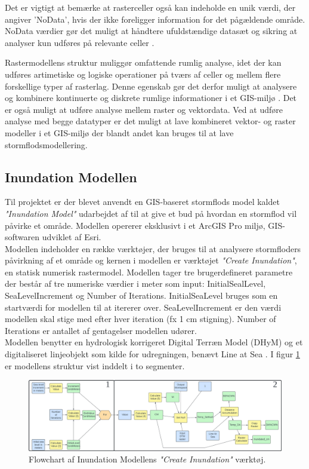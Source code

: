 Det er vigtigt at bemærke at rasterceller også kan indeholde en unik værdi, der angiver 'NoData', hvis der ikke foreligger information for det pågældende område. NoData værdier gør det muligt at håndtere ufuldstændige datasæt og sikring at analyser kun udføres på relevante celler \citep{bolstad_gis_2022, longley_geographical_2008}.

Rastermodellens struktur muliggør omfattende rumlig analyse, idet der kan udføres artimetiske og logiske operationer på tværs af celler og mellem flere forskellige typer af rasterlag. Denne egenskab gør det derfor muligt at analysere og kombinere kontinuerte og diskrete rumlige informationer i et GIS-miljø  \citep{bolstad_gis_2022, longley_geographical_2008}. Det er også muligt at udføre analyse mellem raster og vektordata. Ved at udføre analyse med begge datatyper er det muligt at lave kombineret vektor- og raster modeller i et GIS-miljø der blandt andet kan bruges til at lave stormflodsmodellering.

\subsection{Inundation Modellen} \label{Afsnit: Inundation Model}

Til projektet er der blevet anvendt en GIS-baseret stormflods model kaldet \textit{"Inundation Model"} udarbejdet af \cite{balstrom_kirby_inundation} til at give et bud på hvordan en stormflod vil påvirke et område. Modellen opererer eksklusivt i et ArcGIS Pro miljø, GIS-softwaren udviklet af Esri.\\
Modellen indeholder en række værktøjer, der bruges til at analysere stormfloders påvirkning af et område og kernen i modellen er værktøjet \textit{"Create Inundation"}, en statisk numerisk rastermodel. Modellen tager tre brugerdefineret parametre der består af tre numeriske værdier i meter som input: InitialSealLevel, SeaLevelIncrement og Number of Iterations. InitialSeaLevel bruges som en startværdi for modellen til at itererer over. SeaLevelIncrement er den værdi modellen skal stige med efter hver iteration (fx 1 cm stigning). Number of Iterations er antallet af gentagelser modellen udører. \\
Modellen benytter en hydrologisk korrigeret Digital Terræn Model (DHyM) og et digitaliseret linjeobjekt som kilde for udregningen, benævt Line at Sea \citep{balstrom_kirby_inundation}. I figur \ref{Figur: Create Inundation} er modellens struktur vist inddelt i to segmenter.
\begin{figure}[H]
    \centering
    \includegraphics[width=1\linewidth]{images/teori/inundation_model_separated.jpg}
    \caption{Flowchart af Inundation Modellens \textit{"Create Inundation"} værktøj.}
    \label{Figur: Create Inundation}
\end{figure}


